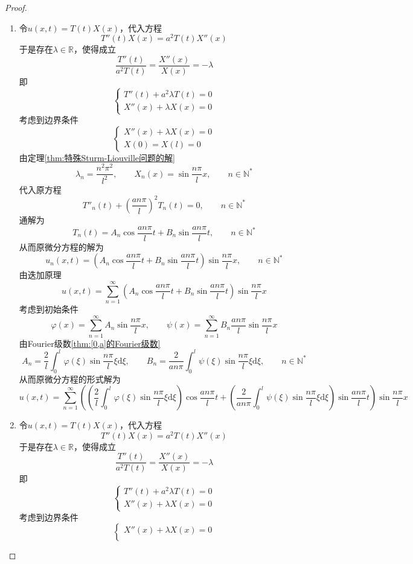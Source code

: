 \documentclass[lang = cn, scheme = chinese, thmcnt = section]{elegantbook}
\newcommand{\N}{\mathbb{N}}            %
\newcommand{\R}{\mathbb{R}}            %
\newcommand{\dd}{\mathrm{d}}           %
\begin{document}
\begin{proof}
	\begin{enumerate}
		\item 令$u(x,t)=T(t)X(x)$，代入方程
		$$
		T''(t)X(x)=a^2T(t)X''(x)
		$$
		于是存在$\lambda\in\R$，使得成立
		$$
		\frac{T''(t)}{a^2T(t)}
		=\frac{X''(x)}{X(x)}
		=-\lambda
		$$
		即%
		$$
		\begin{cases}
			T''(t)+a^2\lambda T(t)=0\\
			X''(x)+\lambda X(x)=0
		\end{cases}
		$$
		考虑到边界条件
		$$
		\begin{cases}
			X''(x)+\lambda X(x)=0\\
			X(0)=X(l)=0
		\end{cases}
		$$
		由定理\ref{thm:特殊Sturm-Liouville问题的解}%
		$$
		\lambda_n=\frac{n^2\pi^2}{l^2},\qquad 
		X_n(x)=\sin\frac{n\pi}{l}x,\qquad n\in\N^*
		$$
		代入原方程
		$$
		T''_n(t)+\left(\frac{an\pi}{l}\right)^2T_n(t)=0,\qquad n\in\N^*
		$$
		通解为
		$$
		T_n(t)=A_n\cos\frac{an\pi}{l}t+B_n\sin \frac{an\pi}{l}t,\qquad 
		n\in\N^*
		$$
		从而原微分方程的解为
		$$
		u_n(x,t)
		=\left(A_n\cos\frac{an\pi}{l}t+B_n\sin \frac{an\pi}{l}t\right)\sin\frac{n\pi}{l}x,\qquad 
		n\in\N^*
		$$
		由迭加原理
		$$
		u(x,t)=\sum_{n=1}^{\infty}\left(A_n\cos\frac{an\pi}{l}t+B_n\sin \frac{an\pi}{l}t\right)\sin\frac{n\pi}{l}x
		$$
		考虑到初始条件
		$$
		\varphi(x)=\sum_{n=1}^{\infty}A_n\sin\frac{n\pi}{l}x,\qquad 
		\psi(x)=\sum_{n=1}^{\infty}B_n\frac{an\pi}{l}\sin\frac{n\pi}{l}x
		$$
		由Fourier级数\ref{thm:[0,a]的Fourier级数}
		$$
		A_n=\frac{2}{l}\int_0^l\varphi(\xi)\sin\frac{n\pi }{l}\xi\dd \xi,\qquad 
		B_n=\frac{2}{an\pi}\int_0^l\psi(\xi)\sin\frac{n\pi }{l}\xi\dd \xi,\qquad 
		n\in\N^*
		$$
		从而原微分方程的形式解为
		$$
		u(x,t)=\sum_{n=1}^{\infty}\left(\left(\frac{2}{l}\int_0^l\varphi(\xi)\sin\frac{n\pi }{l}\xi\dd \xi\right)\cos\frac{an\pi}{l}t+\left(\frac{2}{an\pi}\int_0^l\psi(\xi)\sin\frac{n\pi }{l}\xi\dd \xi\right)\sin \frac{an\pi}{l}t\right)\sin\frac{n\pi}{l}x
		$$
		\item 令$u(x,t)=T(t)X(x)$，代入方程
		$$
		T''(t)X(x)=a^2T(t)X''(x)
		$$
		于是存在$\lambda\in\R$，使得成立
		$$
		\frac{T''(t)}{a^2T(t)}
		=\frac{X''(x)}{X(x)}
		=-\lambda
		$$
		即%
		$$
		\begin{cases}
			T''(t)+a^2\lambda T(t)=0\\
			X''(x)+\lambda X(x)=0
		\end{cases}
		$$
		考虑到边界条件
		$$
		\begin{cases}
			X''(x)+\lambda X(x)=0\\

\end{cases}$$
\end{enumerate}
\end{proof}
\end{document}
